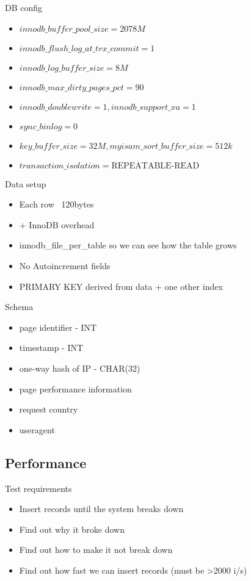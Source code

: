 \documentclass{beamer}
\begin{document}
\begin{frame}{DB config}
  \begin{itemize}
  \item $ innodb\_buffer\_pool\_size=2078M $
  \item $ innodb\_flush\_log\_at\_trx\_commit=1 $
  \item $ innodb\_log\_buffer\_size=8M $
  \item $ innodb\_max\_dirty\_pages\_pct=90 $
  \item $ innodb\_doublewrite=1, innodb\_support\_xa=1 $
  \item $ sync\_binlog=0 $
  \item $ key\_buffer\_size=32M, myisam\_sort\_buffer\_size=512k $
  \item $ transaction\_isolation=\text{REPEATABLE-READ} $
  \end{itemize}
\end{frame}

\begin{frame}{Data setup}
  \begin{itemize}
  \item Each row ~120bytes
  \item + InnoDB overhead
  \item innodb\_file\_per\_table so we can see how the table grows
  \item No Autoincrement fields
  \item PRIMARY KEY derived from data + one other index
  \end{itemize}
\end{frame}

\begin{frame}{Schema}
  \begin{itemize}
  \item page identifier - INT
  \item timestamp - INT
  \item one-way hash of IP - CHAR(32)
  \item page performance information
  \item request country
  \item useragent
  \end{itemize}
\end{frame}

\subsection{Performance}
\begin{frame}{Test requirements}
  \begin{itemize}
  \item Insert records until the system breaks down
  \item<2-> Find out why it broke down
  \item<3-> Find out how to make it not break down
  \item<4-> Find out how fast we can insert records (must be >2000 i/s)
  \end{itemize}
\end{frame}
\end{document}
